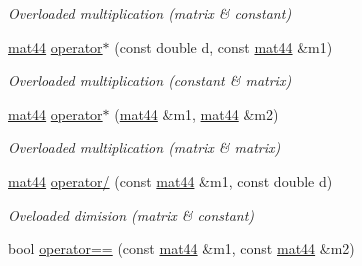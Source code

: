 \begin{DoxyCompactItemize}
\begin{DoxyCompactList}\small\item\em \-Overloaded multiplication (matrix \& constant) \end{DoxyCompactList}\item 
\hypertarget{classutil_1_1math_1_1mat44_a3a624131f174470fa30cd41e92fd3506}{\hyperlink{classutil_1_1math_1_1mat44}{mat44} \hyperlink{classutil_1_1math_1_1mat44_a3a624131f174470fa30cd41e92fd3506}{operator$\ast$} (const double d, const \hyperlink{classutil_1_1math_1_1mat44}{mat44} \&m1)}\label{classutil_1_1math_1_1mat44_a3a624131f174470fa30cd41e92fd3506}

\begin{DoxyCompactList}\small\item\em \-Overloaded multiplication (constant \& matrix) \end{DoxyCompactList}\item 
\hypertarget{classutil_1_1math_1_1mat44_a2126d758b6632ee68975cb2107357333}{\hyperlink{classutil_1_1math_1_1mat44}{mat44} \hyperlink{classutil_1_1math_1_1mat44_a2126d758b6632ee68975cb2107357333}{operator$\ast$} (\hyperlink{classutil_1_1math_1_1mat44}{mat44} \&m1, \hyperlink{classutil_1_1math_1_1mat44}{mat44} \&m2)}\label{classutil_1_1math_1_1mat44_a2126d758b6632ee68975cb2107357333}

\begin{DoxyCompactList}\small\item\em \-Overloaded multiplication (matrix \& matrix) \end{DoxyCompactList}\item 
\hypertarget{classutil_1_1math_1_1mat44_ad3b36b1f1928e0d46286fd1a6b2e0256}{\hyperlink{classutil_1_1math_1_1mat44}{mat44} \hyperlink{classutil_1_1math_1_1mat44_ad3b36b1f1928e0d46286fd1a6b2e0256}{operator/} (const \hyperlink{classutil_1_1math_1_1mat44}{mat44} \&m1, const double d)}\label{classutil_1_1math_1_1mat44_ad3b36b1f1928e0d46286fd1a6b2e0256}

\begin{DoxyCompactList}\small\item\em \-Oveloaded dimision (matrix \& constant) \end{DoxyCompactList}\item 
\hypertarget{classutil_1_1math_1_1mat44_adf1bb2f5acfde2320a77b40dfafdc828}{bool \hyperlink{classutil_1_1math_1_1mat44_adf1bb2f5acfde2320a77b40dfafdc828}{operator==} (const \hyperlink{classutil_1_1math_1_1mat44}{mat44} \&m1, const \hyperlink{classutil_1_1math_1_1mat44}{mat44} \&m2)}\label{classutil_1_1math_1_1mat44_adf1bb2f5acfde2320a77b40dfafdc828}


\end{DoxyCompactItemize}
